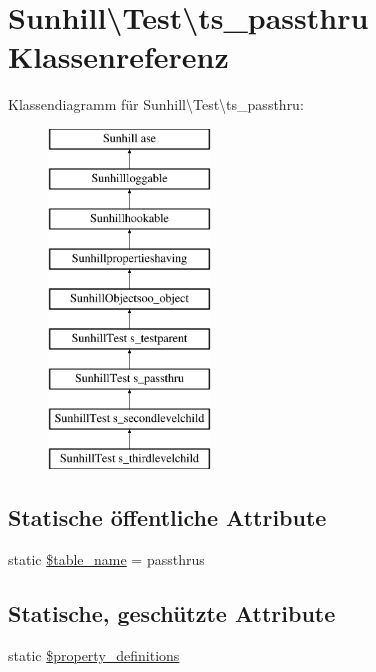 \hypertarget{classSunhill_1_1Test_1_1ts__passthru}{}\section{Sunhill\textbackslash{}Test\textbackslash{}ts\+\_\+passthru Klassenreferenz}
\label{classSunhill_1_1Test_1_1ts__passthru}
Klassendiagramm für Sunhill\textbackslash{}Test\textbackslash{}ts\+\_\+passthru\+:\begin{figure}[H]
\begin{center}
\leavevmode
\includegraphics[height=9.000000cm]{d7/d8d/classSunhill_1_1Test_1_1ts__passthru}
\end{center}
\end{figure}
\subsection*{Statische öffentliche Attribute}
\begin{DoxyCompactItemize}
\item 
static \hyperlink{classSunhill_1_1Test_1_1ts__passthru_a6f7f22dad68cf8cb1334a5df6cbe218c}{\$table\+\_\+name} = \textquotesingle{}passthrus\textquotesingle{}
\end{DoxyCompactItemize}
\subsection*{Statische, geschützte Attribute}
\begin{DoxyCompactItemize}
\item 
static \hyperlink{classSunhill_1_1Test_1_1ts__passthru_a906f984ce338fc0ece8bab2e81482fdc}{\$property\+\_\+definitions}
\end{DoxyCompactItemize}
